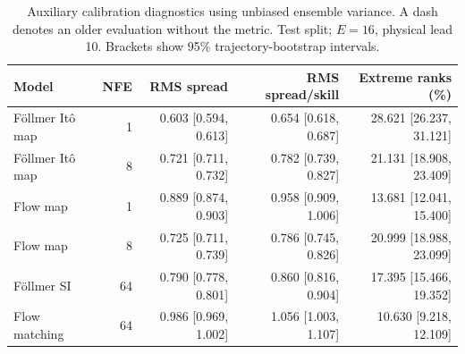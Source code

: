 \begin{table}[t]
\centering
\small
\setlength{\tabcolsep}{3pt}
\caption{Auxiliary calibration diagnostics using unbiased ensemble variance. A dash denotes an older evaluation without the metric. Test split; $E=16$, physical lead 10. Brackets show 95\% trajectory-bootstrap intervals.}
\label{tab:map-rms-calibration}
\begin{tabular}{lrrrr}
\toprule
Model & NFE & RMS spread & RMS spread/skill & Extreme ranks (\%) \\
\midrule
Föllmer Itô map & 1 & 0.603 [0.594, 0.613] & 0.654 [0.618, 0.687] & 28.621 [26.237, 31.121] \\
Föllmer Itô map & 8 & 0.721 [0.711, 0.732] & 0.782 [0.739, 0.827] & 21.131 [18.908, 23.409] \\
\addlinespace
Flow map & 1 & 0.889 [0.874, 0.903] & 0.958 [0.909, 1.006] & 13.681 [12.041, 15.400] \\
Flow map & 8 & 0.725 [0.711, 0.739] & 0.786 [0.745, 0.826] & 20.999 [18.988, 23.099] \\
\addlinespace
Föllmer SI & 64 & 0.790 [0.778, 0.801] & 0.860 [0.816, 0.904] & 17.395 [15.466, 19.352] \\
\addlinespace
Flow matching & 64 & 0.986 [0.969, 1.002] & 1.056 [1.003, 1.107] & 10.630 [9.218, 12.109] \\
\bottomrule
\end{tabular}
\end{table}
